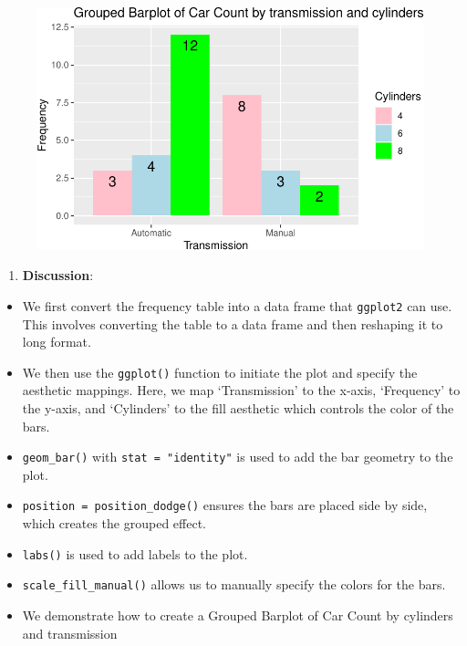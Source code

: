 \documentclass[
  letterpaper,
  DIV=11,
  numbers=noendperiod]{scrreport}
\providecommand{\tightlist}{%
  \setlength{\itemsep}{0pt}\setlength{\parskip}{0pt}}\usepackage{longtable,booktabs,array}
\begin{document}
\begin{figure}[H]

{\centering \includegraphics{08CategoricalData02_files/figure-pdf/unnamed-chunk-21-1.pdf}

}

\end{figure}

\begin{enumerate}
\def\labelenumi{\arabic{enumi}.}
\setcounter{enumi}{2}
\tightlist
\item
  \textbf{Discussion}:
\end{enumerate}

\begin{itemize}
\item
  We first convert the frequency table into a data frame that
  \texttt{ggplot2} can use. This involves converting the table to a data
  frame and then reshaping it to long format.
\item
  We then use the \texttt{ggplot()} function to initiate the plot and
  specify the aesthetic mappings. Here, we map `Transmission' to the
  x-axis, `Frequency' to the y-axis, and `Cylinders' to the fill
  aesthetic which controls the color of the bars.
\item
  \texttt{geom\_bar()} with \texttt{stat\ =\ "identity"} is used to add
  the bar geometry to the plot.
\item
  \texttt{position\ =\ position\_dodge()} ensures the bars are placed
  side by side, which creates the grouped effect.
\item
  \texttt{labs()} is used to add labels to the plot.
\item
  \texttt{scale\_fill\_manual()} allows us to manually specify the
  colors for the bars.
\item
  We demonstrate how to create a Grouped Barplot of Car Count by
  cylinders and transmission
\end{itemize}
\end{document}
